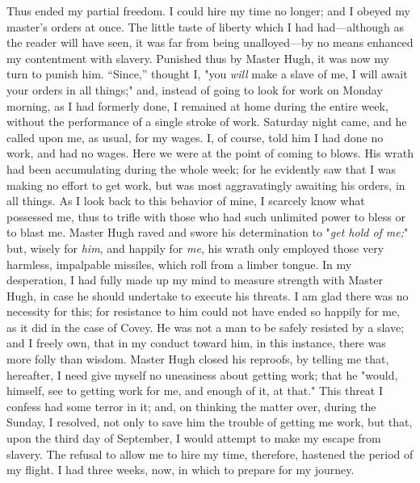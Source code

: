 Thus ended my partial freedom. I could hire my time no longer; and I
obeyed my master's orders at once. The little taste of liberty which I
had had---although as the reader will have seen, it was far from being
unalloyed---by no means enhanced my
{\protect\hypertarget{331}{}{}}contentment with slavery. Punished thus
by Master Hugh, it was now my turn to punish him. ``Since,'' thought I,
"you \emph{will} make a slave of me, I will await your orders in all
things;" and, instead of going to look for work on Monday morning, as I
had formerly done, I remained at home during the entire week, without
the performance of a single stroke of work. Saturday night came, and he
called upon me, as usual, for my wages. I, of course, told him I had
done no work, and had no wages. Here we were at the point of coming to
blows. His wrath had been accumulating during the whole week; for he
evidently saw that I was making no effort to get work, but was most
aggravatingly awaiting his orders, in all things. As I look back to this
behavior of mine, I scarcely know what possessed me, thus to trifle with
those who had such unlimited power to bless or to blast me. Master Hugh
raved and swore his determination to "\emph{get hold of me;}" but,
wisely for \emph{him}, and happily for \emph{me}, his wrath only
employed those very harmless, impalpable missiles, which roll from a
limber tongue. In my desperation, I had fully made up my mind to measure
strength with Master Hugh, in case he should undertake to execute his
threats. I am glad there was no necessity for this; for resistance to
him could not have ended so happily for me, as it did in the case of
Covey. He was not a man to be safely resisted by a slave; and I freely
own, that in my conduct toward him, in this instance, there was more
folly than wisdom. Master Hugh closed his reproofs, by telling me that,
hereafter, I need give myself no uneasiness about getting work; that he
"would, himself, see to {\protect\hypertarget{332}{}{}}getting work for
me, and enough of it, at that." This threat I confess had some terror in
it; and, on thinking the matter over, during the Sunday, I resolved, not
only to save him the trouble of getting me work, but that, upon the
third day of September, I would attempt to make my escape from slavery.
The refusal to allow me to hire my time, therefore, hastened the period
of my flight. I had three weeks, now, in which to prepare for my
journey.

